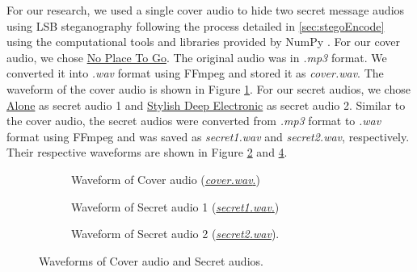 \documentclass[a4paper]{cas-sc}
\begin{document}
For our research, we used a single cover audio to hide two secret message audios using LSB steganography following the process detailed in \ref{sec:stegoEncode} using the computational tools and libraries provided by NumPy \cite{harris2020array}. For our cover audio, we chose \href{https://pixabay.com/music/beats-no-place-to-go-216744/}{No Place To Go}. The original audio was in \textit{.mp3} format. We converted it into \textit{.wav} format using FFmpeg \cite{newmarch2017ffmpeg} and stored it as \textit{cover.wav}. The waveform of the cover audio is shown in Figure \ref{fig:coverAudio}. For our secret audios, we chose \href{https://pixabay.com/music/future-bass-alone-296348/}{Alone} as secret audio 1 and \href{https://pixabay.com/music/future-bass-stylish-deep-electronic-262632/}{Stylish Deep Electronic} as secret audio 2. Similar to the cover audio, the secret audios were converted from \textit{.mp3} format to \textit{.wav} format using FFmpeg and was saved as \textit{secret1.wav} and \textit{secret2.wav}, respectively. Their respective waveforms are shown in Figure \ref{fig:secretAudio1} and \ref{fig:secretAudio2}.

\begin{figure}[pos=H]
    \begin{center}
        \begin{subfigure}[!h]{0.45\textwidth}
            
            \caption{Waveform of Cover audio (\href{https://drive.google.com/file/d/13kdXTKmjT0xhZVx6o9LQ5Vw33wbg7ZUV/view?usp=drive_link}{\textit{cover.wav}.})}
            \label{fig:coverAudio}
        \end{subfigure}
    \end{center}
    \begin{subfigure}[!h]{0.45\textwidth}
        \begin{center}
            \centering
            
            \caption{Waveform of Secret audio 1 (\href{https://drive.google.com/file/d/18i7FJQoh4t5WSy7vJ1vKk0Vf5ALFBXbC/view?usp=drive_link}{\textit{secret1.wav}.})}
            \label{fig:secretAudio1}
        \end{center}
    \end{subfigure}
    \hfill
    \begin{subfigure}[!h]{0.45\textwidth}
        \begin{center}
            
            \caption{Waveform of Secret audio 2 (\href{https://drive.google.com/file/d/1-nvo0a90pLwNstRUYJz0A_JeYxTTvCC0/view?usp=drive_link}{\textit{secret2.wav}}).}
            \label{fig:secretAudio2}
        \end{center}
    \end{subfigure}
    \caption{Waveforms of Cover audio and Secret audios.}
\end{figure}
\end{document}
